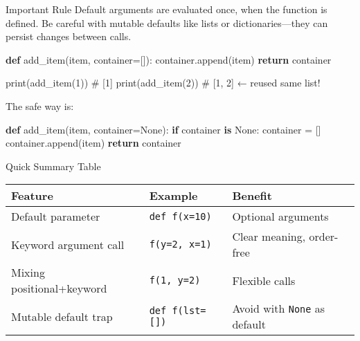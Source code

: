 \documentclass[
  letterpaper,
  DIV=11,
  numbers=noendperiod]{scrreprt}
\newenvironment{Shaded}{\begin{snugshade}}{\end{snugshade}}
\newcommand{\BuiltInTok}[1]{\textcolor[rgb]{0.00,0.23,0.31}{#1}}
\newcommand{\CommentTok}[1]{\textcolor[rgb]{0.37,0.37,0.37}{#1}}
\newcommand{\ControlFlowTok}[1]{\textcolor[rgb]{0.00,0.23,0.31}{\textbf{#1}}}
\newcommand{\DecValTok}[1]{\textcolor[rgb]{0.68,0.00,0.00}{#1}}
\newcommand{\KeywordTok}[1]{\textcolor[rgb]{0.00,0.23,0.31}{\textbf{#1}}}
\newcommand{\NormalTok}[1]{\textcolor[rgb]{0.00,0.23,0.31}{#1}}
\newcommand{\OperatorTok}[1]{\textcolor[rgb]{0.37,0.37,0.37}{#1}}
\newcommand{\VariableTok}[1]{\textcolor[rgb]{0.07,0.07,0.07}{#1}}
\begin{document}
Important Rule Default arguments are evaluated once, when the function
is defined. Be careful with mutable defaults like lists or
dictionaries---they can persist changes between calls.

\begin{Shaded}
\begin{Highlighting}[]
\KeywordTok{def}\NormalTok{ add\_item(item, container}\OperatorTok{=}\NormalTok{[]):}
\NormalTok{    container.append(item)}
    \ControlFlowTok{return}\NormalTok{ container}

\BuiltInTok{print}\NormalTok{(add\_item(}\DecValTok{1}\NormalTok{))   }\CommentTok{\# [1]}
\BuiltInTok{print}\NormalTok{(add\_item(}\DecValTok{2}\NormalTok{))   }\CommentTok{\# [1, 2]  ← reused same list!}
\end{Highlighting}
\end{Shaded}

The safe way is:

\begin{Shaded}
\begin{Highlighting}[]
\KeywordTok{def}\NormalTok{ add\_item(item, container}\OperatorTok{=}\VariableTok{None}\NormalTok{):}
    \ControlFlowTok{if}\NormalTok{ container }\KeywordTok{is} \VariableTok{None}\NormalTok{:}
\NormalTok{        container }\OperatorTok{=}\NormalTok{ []}
\NormalTok{    container.append(item)}
    \ControlFlowTok{return}\NormalTok{ container}
\end{Highlighting}
\end{Shaded}

Quick Summary Table

\begin{longtable}[]{@{}
  >{\raggedright\arraybackslash}p{}
  >{\raggedright\arraybackslash}p{}
  >{\raggedright\arraybackslash}p{}@{}}
\toprule\noalign{}
\begin{minipage}[b]{\linewidth}\raggedright
Feature
\end{minipage} & \begin{minipage}[b]{\linewidth}\raggedright
Example
\end{minipage} & \begin{minipage}[b]{\linewidth}\raggedright
Benefit
\end{minipage} \\
\midrule\noalign{}
\endhead
\bottomrule\noalign{}
\endlastfoot
Default parameter & \texttt{def\ f(x=10)} & Optional arguments \\
Keyword argument call & \texttt{f(y=2,\ x=1)} & Clear meaning,
order-free \\
Mixing positional+keyword & \texttt{f(1,\ y=2)} & Flexible calls \\
Mutable default trap & \texttt{def\ f(lst={[}{]})} & Avoid with
\texttt{None} as default \\
\end{longtable}
\end{document}
